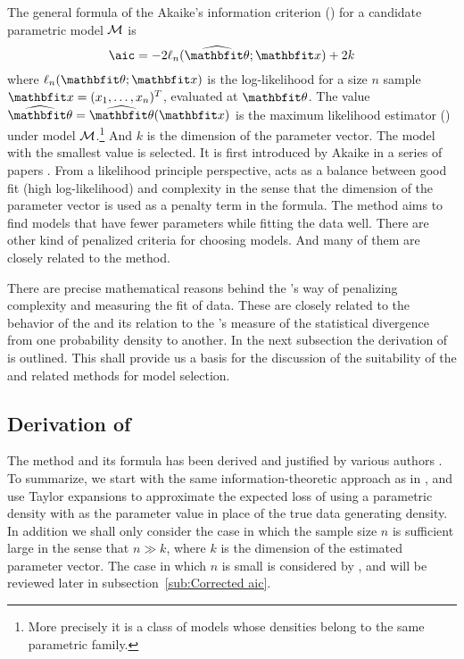 The general formula of the Akaike's information criterion (\aic) for a
candidate parametric model $\mathcal{M}$ is
\begin{equation}
  \text{\aic} = -2\ell_n(\hbth;\bfx) + 2k
\end{equation}
where $\ell_n(\bth;\bfx)$ is the log-likelihood for a size $n$ sample
$\bfx=(x_1,\dots,x_n)^T$, evaluated at $\bth$. The value $\hbth = \hbth(\bfx)$
is the maximum likelihood estimator (\mle) under model $\mathcal{M}$.\footnote{More
  precisely it is a class of models whose densities belong to the same
  parametric family.} And $k$ is the dimension of the parameter vector. The
model with the smallest \aic value is selected. It is first introduced by
Akaike in a series of papers \parencite{Akaike:1973uc, Akaike:1974ih,
  Akaike:1977ul}. From a likelihood principle perspective, \aic acts as a
balance between good fit (high log-likelihood) and complexity in the sense
that the dimension of the parameter vector is used as a penalty term in the
formula.  The \aic method aims to find models that have fewer parameters while
fitting the data well. There are other kind of penalized criteria for choosing
models.  And many of them are closely related to the \aic method.


There are precise mathematical reasons behind the \aic's way of penalizing
complexity and measuring the fit of data. These are closely related to the
behavior of the \mle and its relation to the \textcite{Kullback:1951va}'s
measure of the statistical divergence from one probability density to another.
In the next subsection the derivation of \aic is outlined. This shall provide
us a basis for the discussion of the suitability of the \aic and related
methods for model selection.

\subsection{Derivation of \protect\aic}
\label{sub:Derivation of aic}

The \aic method and its formula has been derived and justified by various
authors \parencite[e.g.][]{Stone:1982ck, Sawa:1978tn, Chow:1981te,
  Bozdogan:1987wy, Akaike:1973uc}. To summarize, we start with the same
information-theoretic approach as in \textcite{Akaike:1973uc}, and use Taylor
expansions to approximate the expected loss of using a parametric density with
\mle as the parameter value in place of the true data generating density. In
addition we shall only consider the case in which the sample size $n$ is
sufficient large in the sense that $n\gg k$, where $k$ is the dimension of the
estimated parameter vector. The case in which $n$ is small is considered by
\textcite{Hurvich:1989ev}, and will be reviewed later in
subsection~\ref{sub:Corrected aic}.

